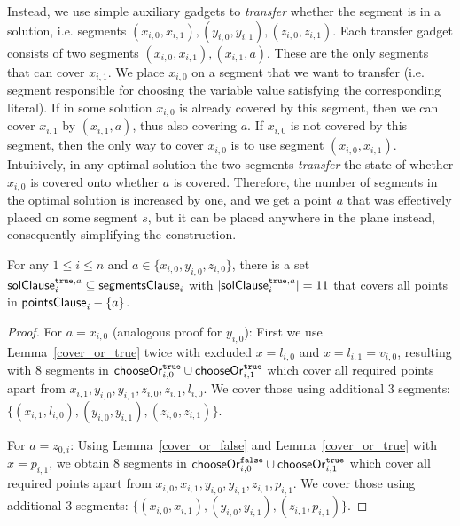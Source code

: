 Instead, we use simple auxiliary gadgets to
\textit{transfer} whether the segment
is in a solution, i.e. segments
$(x_{i, 0}, x_{i, 1}), (y_{i, 0}, y_{i, 1}), (z_{i, 0}, z_{i, 1})$.
Each transfer gadget consists of two segments $(x_{i, 0}, x_{i, 1}), (x_{i, 1}, a)$.
These are the only segments that can cover $x_{i,1}$.
We place $x_{i,0}$ on a segment that we want to transfer (i.e.
segment responsible for choosing the variable value satisfying the
corresponding literal).
If in some solution $x_{i,0}$ is already covered by this segment, then
we can cover $x_{i,1}$ by $(x_{i,1}, a)$, thus also covering $a$.
If $x_{i,0}$ is not covered by this segment,
then the only way to cover $x_{i,0}$ is to use segment $(x_{i, 0}, x_{i, 1})$.
Intuitively,
in any optimal solution the two segments \textit{transfer} the state of whether $x_{i,0}$
is covered onto whether $a$ is covered.
Therefore, the number of segments in the optimal solution is increased by one,
and we get a point $a$ that was effectively placed
on some segment $s$, but it can be placed anywhere in the plane instead,
consequently simplifying the construction.

\begin{lemma}
\label{cover_clauses_solution_true}
For any $1 \le i \le n$ and $a \in \{ x_{i, 0}, y_{i, 0}, z_{i, 0}\}$,
there is a set $\mathsf{solClause}^{\texttt{true},a}_i \subseteq \mathsf{segmentsClause}_i$
with $|\mathsf{solClause}^{\texttt{true},a}_i| = 11$
that covers all points in $\mathsf{pointsClause}_{i} - \{a\}$.
\end{lemma}

\begin{proof}
For $a = x_{i, 0}$ (analogous proof for $y_{i, 0}$):
First we use Lemma~\ref{cover_or_true} twice with excluded $x = l_{i, 0}$ and
$x = l_{i, 1} = v_{i, 0}$,
resulting with 8 segments in $\mathsf{chooseOr}^{\texttt{true}}_{i,0} \cup \mathsf{chooseOr}^{\texttt{true}}_{i,1}$
which cover all required points apart from
$x_{i, 1}, y_{i, 0}, y_{i, 1}, z_{i, 0}, z_{i, 1}, l_{i, 0}$.
We cover those using additional 3 segments:
$\{ (x_{i, 1}, l_{i, 0}), (y_{i, 0}, y_{i, 1}),
(z_{i, 0}, z_{i, 1}) \}$.

For $a = z_{0, i}$:
Using Lemma~\ref{cover_or_false} and Lemma~\ref{cover_or_true} with
$x = p_{i, 1}$,
we obtain 8 segments in $\mathsf{chooseOr}^{\texttt{false}}_{i,0} \cup \mathsf{chooseOr}^{\texttt{true}}_{i,1}$
which cover all required points apart from
$x_{i, 0}, x_{i, 1}, y_{i, 0}, y_{i, 1}, z_{i, 1}, p_{i, 1}$.
We cover those using additional 3 segments:
$\{ (x_{i, 0}, x_{i, 1}), (y_{i, 0}, y_{i, 1}),
(z_{i, 1}, p_{i, 1}) \}$.
\end{proof}

